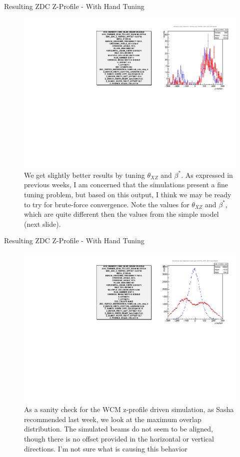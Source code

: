 \begin{frame}{Resulting ZDC Z-Profile - With Hand Tuning}
\begin{figure}
\begin{center}
\includegraphics[width=0.8\linewidth]{../ExploringZProfile/figs/359711_step_0_zvertex_compare_tuned.pdf}
\end{center}
\caption{We get slightly better results by tuning $\theta_{XZ}$ and $\beta^{*}$.
	As expressed in previous weeks, I am concerned that the simulations present a
	fine tuning problem, but based on this output, I think we may be ready to try
	for brute-force convergence. Note the values for $\theta_{XZ}$ and
	$\beta^{*}$, which are quite different then the values from the simple model
	(next slide).}
\label{fig:359711_step_0_zvertex_compare_tuned}
\end{figure}
\end{frame}

\begin{frame}{Resulting ZDC Z-Profile - With Hand Tuning}
\begin{figure}
\begin{center}
\includegraphics[width=0.8\linewidth]{../ExploringZProfile/figs/359711_step_6_zvertex_compare.pdf}
\end{center}
\caption{As a sanity check for the WCM z-profile driven simulation, as Sasha
	recommended last week, we look at the maximum overlap distribution. The
	simulated beams do not seem to be aligned, though there is no offset provided
	in the horizontal or vertical directions. I'm not sure what is causing this
behavior}
\label{fig:359711_step_6_zvertex_compare}
\end{figure}
\end{frame}


